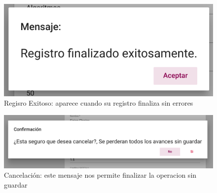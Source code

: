 \begin{figure}[!hbtp]
    \centering
    \hypertarget{exito}{\includegraphics[width=0.7\linewidth]{images/GUA/exito}}
    \caption{Regisro Exitoso: aparece cuando su registro finaliza sin errores}
    \label{exito}
\end{figure}
\begin{figure}[!hbtp]
    \centering
    \hypertarget{cancelarR}{\includegraphics[width=0.7\linewidth]{images/GUA/cancelar}}
    \caption{Cancelación: este mensaje nos permite finalizar la operacion sin guardar}
    \label{cancelarR}
\end{figure}
\newpage
